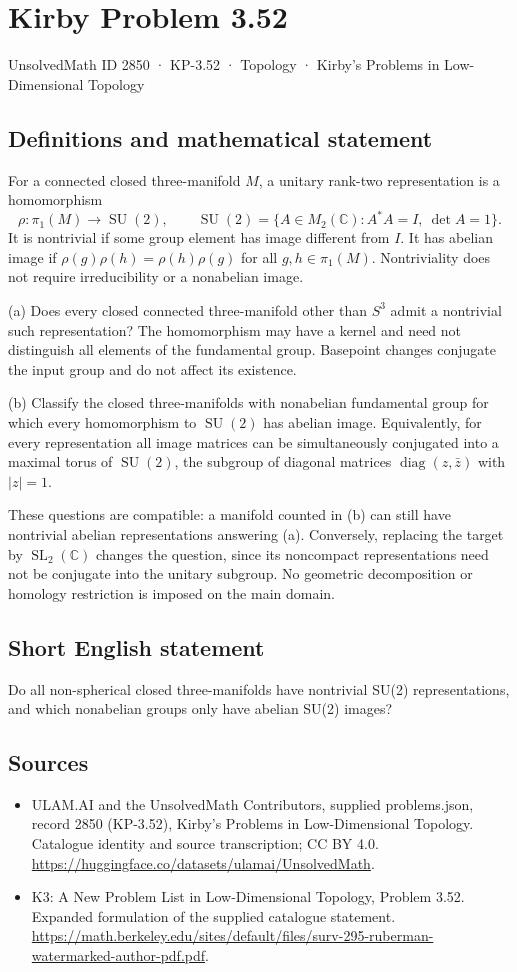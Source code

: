 \documentclass[11pt,a4paper]{article}
\begin{document}
\section*{Kirby Problem 3.52}\label{2850}
{\small UnsolvedMath ID 2850 · KP-3.52 · Topology · Kirby's Problems in Low-Dimensional Topology}
\subsection{Definitions and mathematical statement}
For a connected closed three-manifold $M$, a unitary rank-two representation is a homomorphism
\[
\rho:\pi_1(M)\longrightarrow\operatorname{SU}(2),\qquad
\operatorname{SU}(2)=\{A\in M_2(\mathbb C):A^*A=I,\ \det A=1\}.
\]
It is nontrivial if some group element has image different from $I$. It has abelian image if $\rho(g)\rho(h)=\rho(h)\rho(g)$ for all $g,h\in\pi_1(M)$. Nontriviality does not require irreducibility or a nonabelian image.

(a) Does every closed connected three-manifold other than $S^3$ admit a nontrivial such representation? The homomorphism may have a kernel and need not distinguish all elements of the fundamental group. Basepoint changes conjugate the input group and do not affect its existence.

(b) Classify the closed three-manifolds with nonabelian fundamental group for which every homomorphism to $\operatorname{SU}(2)$ has abelian image. Equivalently, for every representation all image matrices can be simultaneously conjugated into a maximal torus of $\operatorname{SU}(2)$, the subgroup of diagonal matrices $\operatorname{diag}(z,\bar z)$ with $|z|=1$.

These questions are compatible: a manifold counted in (b) can still have nontrivial abelian representations answering (a). Conversely, replacing the target by $\operatorname{SL}_2(\mathbb C)$ changes the question, since its noncompact representations need not be conjugate into the unitary subgroup. No geometric decomposition or homology restriction is imposed on the main domain.
\subsection{Short English statement}
Do all non-spherical closed three-manifolds have nontrivial SU(2) representations, and which nonabelian groups only have abelian SU(2) images?
\subsection{Sources}
\begin{itemize}
\item[S1] ULAM.AI and the UnsolvedMath Contributors, supplied problems.json, record 2850 (KP-3.52), Kirby's Problems in Low-Dimensional Topology. Catalogue identity and source transcription; CC BY 4.0.
\url{https://huggingface.co/datasets/ulamai/UnsolvedMath}.
\item[S2] K3: A New Problem List in Low-Dimensional Topology, Problem 3.52. Expanded formulation of the supplied catalogue statement.
\url{https://math.berkeley.edu/sites/default/files/surv-295-ruberman-watermarked-author-pdf.pdf}.
\end{itemize}
\end{document}
